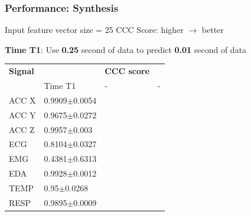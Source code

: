\documentclass[unknownkeysallowed]{beamer}
\begin{document}
\begin{frame}
\frametitle{Performance: Synthesis}

Input feature vector size = 25 \newline 
CCC Score: higher $\longrightarrow$ better

\textbf{Time T1}: Use \textbf{0.25} second of data to predict \textbf{0.01} second of data

\begin{table}
	\renewcommand{\arraystretch}{1.3}
	\label{syn_ccc_s_list}
	\centering
	\begin{tabular}{llll}
		\hline
		\bfseries Signal  & \bfseries  & \bfseries CCC score & \bfseries \\
		       &  Time T1 &  - & - \\
		\hline
		ACC X &   0.9909$\pm$0.0054 \\ %
		ACC Y &   0.9675$\pm$0.0272 \\ %
		ACC Z  &   0.9957$\pm$0.003 \\ %
		ECG &   0.8104$\pm$0.0327 \\ %
		EMG &   0.4381$\pm$0.6313 \\ %
		EDA &   0.9928$\pm$0.0012 \\ %
		TEMP &  0.95$\pm$0.0268 \\ %
		RESP &  0.9895$\pm$0.0009 \\ %
		\hline
	\end{tabular}
\end{table}

\end{frame}
\end{document}

